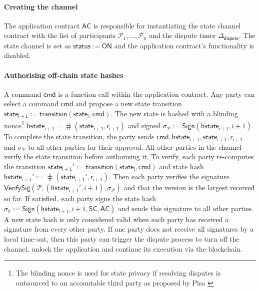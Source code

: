 \documentclass{llncs}
\newcommand{\chanstatus}{\mathsf{status}}
\newcommand{\chanon}{\mathsf{ON}}
\newcommand{\cmd}{\mathsf{cmd}}
\newcommand{\hstatei}{\mathsf{hstate}_{\monotoniccounter}}
\newcommand{\hstateplus}{\ensuremath{\mathsf{hstate}_{\monotoniccounter+1}}}
\newcommand{\monotoniccounter}{\mathsf{i}}
\newcommand{\stateinfoi}{\mathsf{state}_{\mathsf{i}}}
\newcommand{\stateinfoplus}{\mathsf{state}_{\mathsf{i+1}}}
\newcommand{\participant}{\mathcal{P}}
\newcommand{\rani}{\mathsf{r}_{\mathsf{i}}}
\newcommand{\ran}{\mathsf{r}}
\newcommand{\ranplus}{\mathsf{r}_{\mathsf{i+1}}}
\newcommand{\statechannel}{\mathsf{SC}}
\newcommand{\sign}{\mathsf{Sign}}
\newcommand{\verifysig}{\mathsf{VerifySig}}
\newcommand{\appcontract}{\mathsf{AC}}
\newcommand{\timerdispute}{\mathsf{\Delta}_{\mathsf{dispute}}}
\begin{document}
\paragraph{Creating the channel} 

The application contract $\appcontract$ is responsible for instantiating the state channel contract with the list of participants $\participant_{1},...,\participant_{n}$ and the dispute timer $\timerdispute$.
The state channel is set as $\chanstatus := \chanon$ and the application contract's functionality is disabled. 


\paragraph{Authorising off-chain state hashes}
A command $\cmd$ is a function call within the application contract.
Any party can select a command $\cmd$ and propose a new state transition $\stateinfoplus := \mathsf{transition}(\stateinfoi, \cmd)$.
The new state is hashed  with a blinding nonce\footnote{The blinding nonce is used for state privacy if resolving disputes is outsourced to an accountable third party as proposed by Pisa \cite{mccorry2018pisa}}  $\hstateplus = \hash(\stateinfoplus, \ranplus)$ and signed  $\sigma_{\participant} := \sign(\hstateplus,\monotoniccounter+1)$.
To complete the state transition, the party sends $\cmd,\hstateplus, \stateinfoplus, \ranplus$ and $\sigma_{\participant}$ to all other parties for their approval.
All other parties in the channel verify the state transition before authorising it. 
To verify, each party re-computes the transition $\stateinfoplus' := \mathsf{transition}(\stateinfoi, \cmd)$ and state hash $\hstateplus' := \hash(\stateinfoplus', \ranplus)$.
Then each party verifies the signature $\verifysig(\participant, (\hstateplus', \monotoniccounter+1), \sigma_{\participant})$ and that the version is the largest received so far. 
If satisfied, each party signs the state hash  $\sigma_{k} := \sign(\hstateplus,\monotoniccounter+1, \statechannel, \appcontract)$ and sends this signature to all other parties. 
A new state hash is only considered valid when each party has received a signature from every other party.  
If one party does not receive all signatures by a local time-out, then this party can trigger the dispute process to turn off the channel, unlock the application and continue its execution via the blockchain. 
\end{document}
